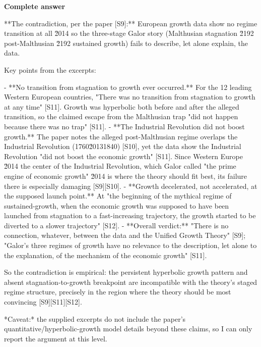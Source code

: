 \documentclass[10pt]{article}
\begin{document}
\textbf{Complete answer}
\begin{AnswerText}
**The contradiction, per the paper [S9]:** European growth data show no regime transition at all \u2014 so the three-stage Galor story (Malthusian stagnation \u2192 post-Malthusian \u2192 sustained growth) fails to describe, let alone explain, the data.

Key points from the excerpts:

- **No transition from stagnation to growth ever occurred.** For the 12 leading Western European countries, "There was no transition from stagnation to growth at any time" [S11]. Growth was hyperbolic both before and after the alleged transition, so the claimed escape from the Malthusian trap "did not happen because there was no trap" [S11].
- **The Industrial Revolution did not boost growth.** The paper notes the alleged post-Malthusian regime overlaps the Industrial Revolution (1760\u20131840) [S10], yet the data show the Industrial Revolution "did not boost the economic growth" [S11]. Since Western Europe \u2014 the center of the Industrial Revolution, which Galor called "the prime engine of economic growth" \u2014 is where the theory should fit best, its failure there is especially damaging [S9][S10].
- **Growth decelerated, not accelerated, at the supposed launch point.** At "the beginning of the mythical regime of sustained-growth, when the economic growth was supposed to have been launched from stagnation to a fast-increasing trajectory, the growth started to be diverted to a slower trajectory" [S12].
- **Overall verdict:** "There is no connection, whatever, between the data and the Unified Growth Theory" [S9]; "Galor's three regimes of growth have no relevance to the description, let alone to the explanation, of the mechanism of the economic growth" [S11].

So the contradiction is empirical: the persistent hyperbolic growth pattern and absent stagnation-to-growth breakpoint are incompatible with the theory's staged regime structure, precisely in the region where the theory should be most convincing [S9][S11][S12].

*Caveat:* the supplied excerpts do not include the paper's quantitative/hyperbolic-growth model details beyond these claims, so I can only report the argument at this level.
\end{AnswerText}
\end{document}
